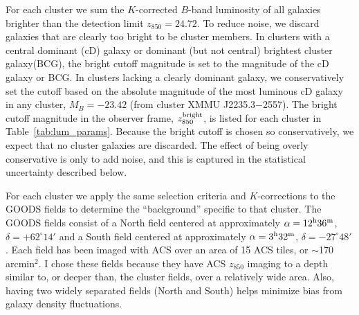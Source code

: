 

For each cluster we sum the $K$-corrected $B$-band luminosity of all
galaxies brighter than the detection limit $z_{850} = 24.72$.  To
reduce noise, we discard galaxies that are clearly too bright to be
cluster members. In clusters with a central dominant (cD) galaxy or
dominant (but not central) brightest cluster galaxy(BCG), the bright
cutoff magnitude is set to the magnitude of the cD galaxy or BCG. In
clusters lacking a clearly dominant galaxy, we conservatively set the
cutoff based on the absolute magnitude of the most luminous cD galaxy
in any cluster, $M_B = -23.42$ (from cluster XMMU J2235.3$-$2557). The
bright cutoff magnitude in the observer frame, $z_{850}^{\rm bright}$,
is listed for each cluster in Table~\ref{tab:lum_params}.  Because
the bright cutoff is chosen so conservatively, we expect that no
cluster galaxies are discarded. The effect of being overly
conservative is only to add noise, and this is captured in the
statistical uncertainty described below.

For each cluster we apply the same selection criteria and
$K$-corrections to the GOODS fields to determine the ``background''
specific to that cluster. The GOODS fields
consist of a North field centered at approximately $\alpha = 12^{\rm
h} 36^{\rm m}$, $\delta = +62^{\circ} 14'$ and a South field centered
at approximately $\alpha = 3^{\rm h} 32^{\rm m}$, $\delta =
-27^{\circ} 48'$. Each field has been imaged with ACS over an area of
15 ACS tiles, or $\sim$170 arcmin$^2$. I chose these fields because
they have ACS $z_{850}$ imaging to a depth similar to, or deeper than,
the cluster fields, over a relatively wide area. Also, having two widely
separated fields (North and South) helps minimize bias from galaxy
density fluctuations.

